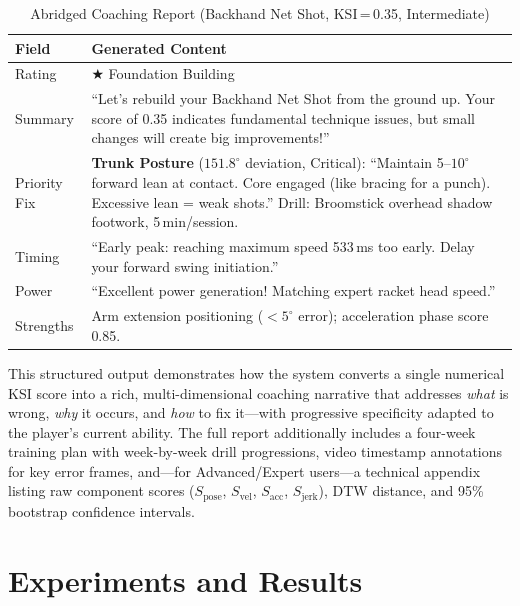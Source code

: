 \documentclass[pdflatex,sn-mathphys-num]{sn-jnl}%
\theoremstyle{thmstyleone}%
\theoremstyle{thmstyletwo}%
\theoremstyle{thmstylethree}%
\begin{document}
\begin{table}[h]
\caption{Abridged Coaching Report (Backhand Net Shot, KSI\,=\,0.35, Intermediate)}\label{tab_coach_example}
\centering
\small
\setlength{\tabcolsep}{4pt}
\renewcommand{\arraystretch}{1.2}
\begin{tabular}{|l|p{10.5cm}|}
\hline
\textbf{Field} & \textbf{Generated Content} \\
\hline
Rating & $\bigstar$ Foundation Building \\
\hline
Summary & ``Let's rebuild your Backhand Net Shot from the ground up. Your score of 0.35 indicates fundamental technique issues, but small changes will create big improvements!'' \\
\hline
Priority Fix & \textbf{Trunk Posture} ($151.8^{\circ}$ deviation, Critical): ``Maintain 5--$10^{\circ}$ forward lean at contact. Core engaged (like bracing for a punch). Excessive lean = weak shots.'' Drill: Broomstick overhead shadow footwork, 5\,min/session. \\
\hline
Timing & ``Early peak: reaching maximum speed 533\,ms too early. Delay your forward swing initiation.'' \\
\hline
Power & ``Excellent power generation! Matching expert racket head speed.'' \\
\hline
Strengths & Arm extension positioning ($<5^{\circ}$ error); acceleration phase score 0.85. \\
\hline
\end{tabular}
\end{table}

This structured output demonstrates how the system converts a single numerical KSI score into a rich, multi-dimensional coaching narrative that addresses \textit{what} is wrong, \textit{why} it occurs, and \textit{how} to fix it---with progressive specificity adapted to the player's current ability. The full report additionally includes a four-week training plan with week-by-week drill progressions, video timestamp annotations for key error frames, and---for Advanced/Expert users---a technical appendix listing raw component scores ($S_{\text{pose}}$, $S_{\text{vel}}$, $S_{\text{acc}}$, $S_{\text{jerk}}$), DTW distance, and 95\% bootstrap confidence intervals.


\section{Experiments and Results}\label{sec5}
\end{document}
